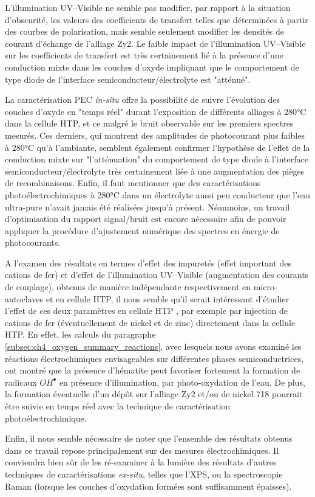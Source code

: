 \begin{refsection}
    L’illumination UV--Visible ne semble pas modifier, par rapport à la situation d’obscurité, les valeurs des
    coefficients de transfert telles que déterminées à partir des courbes de polarisation, mais semble seulement
    modifier les densités de courant d’échange de l’alliage Zy2. Le faible impact de l’illumination UV--Visible sur les
    coefficients de transfert est très certainement lié à la présence d’une conduction mixte dans les couches d’oxyde
    impliquant que le comportement de type diode de l’interface semiconducteur/électrolyte est "atténué".
    
    La caractérisation PEC \emph{in-situ} offre la possibilité de suivre l’évolution des couches d’oxyde en "temps réel"
    durant l’exposition de différents alliages à 280°C dans la cellule HTP, et ce malgré le bruit observable sur les
    premiers spectres mesurés. Ces derniers, qui  montrent des amplitudes de photocourant plus faibles à 280°C qu’à
    l’ambiante, semblent également confirmer l’hypothèse de l’effet de la conduction mixte sur "l’atténuation" du
    comportement de type diode à l’interface semiconducteur/électrolyte très certainement liée à une augmentation des
    pièges de recombinaisons. Enfin, il faut mentionner que des caractérisations photoélectrochimiques à 280°C dans un
    électrolyte aussi peu conducteur que l’eau ultra-pure n’avait jamais été réalisées jusqu’à présent. Néanmoins, un
    travail d’optimisation du rapport signal/bruit est encore nécessaire afin de pouvoir appliquer la procédure
    d’ajustement numérique des spectres en énergie de photocourants.
    
    A l’examen des résultats en termes d’effet des impuretés (effet important des cations de fer) et d’effet de
    l’illumination UV--Visible (augmentation des courants de couplage), obtenus de manière indépendante respectivement en
    micro-autoclaves et en cellule HTP, il nous semble qu’il serait intéressant d’étudier l’effet de ces deux paramètres
    en cellule HTP , par exemple par injection de cations de fer (éventuellement de nickel et de zinc) directement dans
    la cellule HTP. En effet, les calculs du paragraphe \ref{subsec:ch4_oxygen_summary_reactions}, avec lesquels nous avons examiné les réactions
    électrochimiques envisageables sur différentes phases semiconductrices, ont montré que la présence d’hématite peut
    favoriser fortement la formation de radicaux $OH^{\bullet}$ en présence d’illumination, par photo-oxydation de l’eau. De plus,
    la formation éventuelle d’un dépôt sur l’alliage Zy2 et/ou de nickel 718 pourrait être suivie en temps réel avec la
    technique de caractérisation photoélectrochimique.
    
    Enfin, il nous semble nécessaire de noter que l’ensemble des résultats obtenus dans ce travail repose principalement
    sur des mesures électrochimiques. Il conviendra bien sûr de les ré-examiner à la lumière des résultats d’autres
    techniques de caractérisations \emph{ex-situ}, telles que l’XPS, ou la spectroscopie Raman (lorsque les couches d’oxydation
    formées sont suffisamment épaisses).

\singlespacing
\printbibliography[heading=subbibintoc]
\onehalfspacing
\end{refsection}
